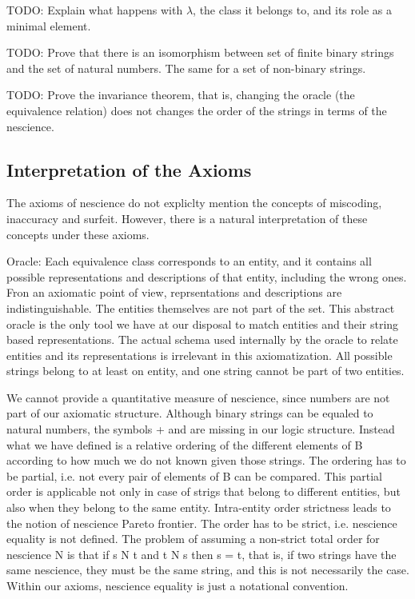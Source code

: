 {\color{red} TODO: Explain what happens with $\lambda$, the class it belongs to, and its role as a minimal element.}


{\color{red} TODO: Prove that there is an isomorphism between set of finite binary strings and the set of natural numbers. The same for a set of non-binary strings.}

{\color{red} TODO: Prove the invariance theorem, that is, changing the oracle (the equivalence relation) does not changes the order of the strings in terms of the nescience.}

%
%

\subsection{Interpretation of the Axioms}

The axioms of nescience do not expliclty mention the concepts of miscoding, inaccuracy and surfeit. However, there is a natural interpretation of these concepts under these axioms.


Oracle: Each equivalence class corresponds to an entity, and it contains all possible representations
and descriptions of that entity, including the wrong ones. Fron an axiomatic point of view,
reprsentations and descriptions are indistinguishable. The entities themselves are not part of the
set. This abstract oracle is the only tool we have at our disposal to match entities and their
string based representations. The actual schema used internally by the oracle to relate entities and
its representations is irrelevant in this axiomatization. All possible strings belong to at least on
entity, and one string cannot be part of two entities.

We cannot provide a quantitative measure of nescience, since numbers are not part of our
axiomatic structure. Although binary strings can be equaled to natural numbers, the symbols +
and  are missing in our logic structure. Instead what we have defined is a relative ordering of
the different elements of B according to how much we do not known given those strings. The
ordering has to be partial, i.e. not every pair of elements of B can be compared. This partial order
is applicable not only in case of strigs that belong to different entities, but also when they belong to
the same entity. Intra-entity order strictness leads to the notion of nescience Pareto frontier. The
order has to be strict, i.e. nescience equality is not defined. The problem of assuming a non-strict
total order for nescience N is that if s N t and t N s then s = t, that is, if two strings have the
same nescience, they must be the same string, and this is not necessarily the case. Within our
axioms, nescience equality is just a notational convention.

